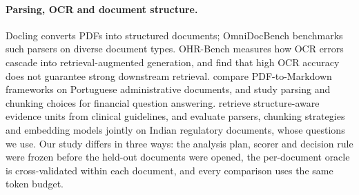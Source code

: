 \paragraph{Parsing, OCR and document structure.} Docling
\citep{auer2024docling} converts PDFs into structured documents;
OmniDocBench \citep{ouyang2024omnidocbench} benchmarks such parsers on
diverse document types. OHR-Bench \citep{zhang2024ocr} measures how OCR
errors cascade into retrieval-augmented generation, and
\citet{sun2026ocr} find that high OCR accuracy does not guarantee strong
downstream retrieval. \citet{santos2026pdf} compare PDF-to-Markdown
frameworks on Portuguese administrative documents, and
\citet{elbachyr2026empirical} study parsing and chunking choices for
financial question answering. \citet{lin2026pdf} retrieve structure-aware
evidence units from clinical guidelines, and \citet{singh2026parser}
evaluate parsers, chunking strategies and embedding models jointly on
Indian regulatory documents, whose questions we use. Our study differs in
three ways: the analysis plan, scorer and decision rule were frozen before
the held-out documents were opened, the per-document oracle is
cross-validated within each document, and every comparison uses the same
token budget.
